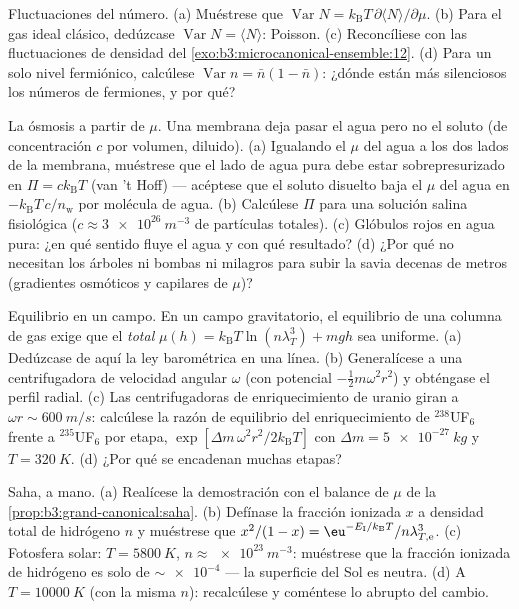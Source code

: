 \begin{exercise}[$\star\star$]\label{exo:b3:grand-canonical:7}
Fluctuaciones del número. (a) Muéstrese que $\operatorname{Var}N =
k_{\text{B}}T\,\partial\langle N\rangle/\partial\mu$. (b) Para el
gas ideal clásico, dedúzcase $\operatorname{Var}N = \langle
N\rangle$: Poisson. (c) Reconcíliese con las fluctuaciones de densidad del
\cref{exo:b3:microcanonical-ensemble:12}. (d) Para un solo nivel
fermiónico, calcúlese $\operatorname{Var}n = \bar n(1 - \bar
n)$: ¿dónde están más silenciosos los números de fermiones, y por qué?
\end{exercise}

\begin{exercise}[$\star\star$]\label{exo:b3:grand-canonical:8}
La ósmosis a partir de $\mu$. Una membrana deja pasar el agua pero no el
soluto (de concentración $c$ por volumen, diluido). (a) Igualando el $\mu$
del agua a los dos lados de la membrana, muéstrese que el lado de agua pura
debe estar sobrepresurizado en $\Pi = ck_{\text{B}}T$ (van 't Hoff) ---
acéptese que el soluto disuelto baja el $\mu$ del agua en
$-k_{\text{B}}T\,c/n_{\text{w}}$ por molécula de agua. (b) Calcúlese
$\Pi$ para una solución salina fisiológica ($c \approx \qty{3e26}{m^{-3}}$
de partículas totales). (c) Glóbulos rojos en agua pura: ¿en qué sentido
fluye el agua y con qué resultado? (d) ¿Por qué no necesitan los árboles ni
bombas ni milagros para subir la savia decenas de metros (gradientes
osmóticos y capilares de $\mu$)?
\end{exercise}

\begin{exercise}[$\star\star$]\label{exo:b3:grand-canonical:9}
Equilibrio en un campo. En un campo gravitatorio, el equilibrio de una
columna de gas exige que el  \emph{total} $\mu(h) =
k_{\text{B}}T\ln(n\lambda_T^3) + mgh$ sea uniforme. (a) Dedúzcase de aquí
la ley barométrica en una línea. (b) Generalícese a una centrifugadora de
velocidad angular $\omega$ (con potencial
$-\tfrac12 m\omega^2r^2$) y obténgase el perfil radial. (c)
Las centrifugadoras de enriquecimiento de uranio giran a $\omega r \sim
\qty{600}{m/s}$: calcúlese la razón de equilibrio del enriquecimiento de
$^{238}$UF$_6$ frente a $^{235}$UF$_6$ por etapa, $\exp[\Delta m\,\omega^2
r^2/2k_{\text{B}}T]$ con $\Delta m = \qty{5e-27}{kg}$ y $T =
\qty{320}{K}$. (d) ¿Por qué se encadenan muchas etapas?
\end{exercise}

\begin{exercise}[$\star\star\star$]\label{exo:b3:grand-canonical:10}
Saha, a mano. (a) Realícese la demostración con el balance de $\mu$ de la
\cref{prop:b3:grand-canonical:saha}. (b) Defínase la fracción ionizada
$x$ a densidad total de hidrógeno $n$ y muéstrese que $x^2/(1 - x)
= \eu^{-E_{\text{I}}/k_{\text{B}}T}/n\lambda_{T,\text{e}}^3$. (c)
Fotosfera solar: $T = \qty{5800}{K}$, $n \approx
\qty{e23}{m^{-3}}$: muéstrese que la fracción ionizada de hidrógeno es solo
de $\sim\num{e-4}$ --- la superficie del Sol es neutra. (d) A $T =
\qty{10000}{K}$ (con la misma $n$): recalcúlese y coméntese lo
abrupto del cambio.
\end{exercise}

